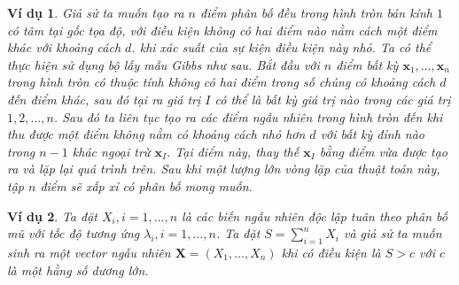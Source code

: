 \documentclass[14pt, a4paper]{article}
\numberwithin{equation}{section}
\numberwithin{figure}{section}
\theoremstyle{sltheorem}
\newtheorem{vd}{Ví dụ}
\theoremstyle{soltheorem}
\numberwithin{dl}{section}
\numberwithin{md}{section}
\numberwithin{vd}{section}
\begin{document}
    \begin{vd} \label{vd:4.40}
        Giả sử ta muốn tạo ra $n$ điểm phân bố đều trong hình tròn bán kính $1$ có tâm tại gốc tọa độ, với điều kiện không có hai điểm nào nằm cách một điểm khác với khoảng cách $d$.
        khi xác suất của sự kiện điều kiện này nhỏ.
        Ta có thể thực hiện sử dụng bộ lấy mẫu Gibbs như sau.
        Bắt đầu với $n$ điểm bất kỳ $\mathbf{x}_1, \dots, \mathbf{x}_n$ trong hình tròn có thuộc tính không có hai điểm trong số chúng có khoảng cách $d$ đến điểm khác, sau đó tại ra giá trị $I$ có thể là bất kỳ giá trị nào trong các giá trị $1, 2, \dots, n$.
        Sau đó ta liên tục tạo ra các điểm ngẫu nhiên trong hình tròn đến khi thu được một điểm không nằm có khoảng cách nhỏ hơn $d$ với bất kỳ đỉnh nào trong $n-1$ khác ngoại trừ $\mathbf{x}_I$.
        Tại điểm này, thay thế $\mathbf{x}_I$ bằng điểm vừa được tạo ra và lặp lại quá trình trên.
        Sau khi một lượng lớn vòng lặp của thuật toán này, tập $n$ điểm sẽ xấp xỉ có phân bố mong muốn.
    \end{vd}

    \begin{vd} \label{vd:4.41}
        Ta đặt $X_i, i = 1, \dots, n$ là các biến ngẫu nhiên độc lập tuân theo phân bố mũ với tốc độ tương ứng $\lambda_i, i = 1, \dots, n$.
        Ta đặt $S=\sum_{i=1}^n X_i$ và giả sử ta muốn sinh ra một vector ngẫu nhiên $\mathbf{X} = (X_1, \dots, X_n)$ khi có điều kiện là $S > c$ với $c$ là một hằng số dương lớn.
    \end{vd}
\end{document}
